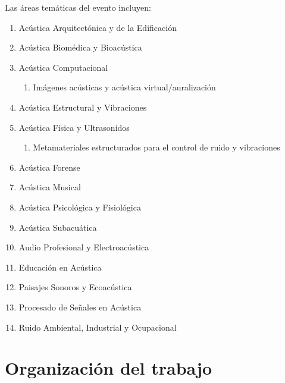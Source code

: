 \vspace{5pt}

Las áreas temáticas del evento incluyen:
%	
\begin{enumerate}[topsep=0ex] \itemsep=0.0pt
    \item Acústica Arquitectónica y de la Edificación
    \item Acústica Biomédica y Bioacústica
    \item Acústica Computacional
    \vspace{-0.25em}
    \begin{enumerate}[noitemsep,topsep=0ex] 
        \item Imágenes acústicas y acústica virtual/auralización
    \end{enumerate}    
    \item Acústica Estructural y Vibraciones
    \item Acústica Física y Ultrasonidos
    \vspace{-0.25em}
    \begin{enumerate}[noitemsep,topsep=0ex]
        \item Metamateriales estructurados para el control de ruido y vibraciones
    \end{enumerate}    
    \item Acústica Forense
    \item Acústica Musical
    \item Acústica Psicológica y Fisiológica
    \item Acústica Subacuática
    \item Audio Profesional y Electroacústica
    \item Educación en Acústica
    \item Paisajes Sonoros y Ecoacústica
    \item Procesado de Señales en Acústica
    \item Ruido Ambiental, Industrial y Ocupacional
\end{enumerate}


\section{Organización del trabajo}

